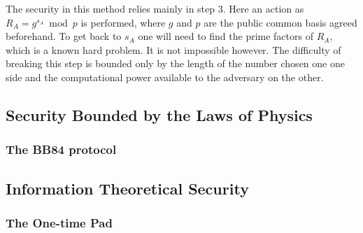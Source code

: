 	The security in this method relies mainly in step 3. Here an action as $ R_A = g^{s_A} \bmod p $ is performed, where $g$ and $p$ are the public common basis agreed beforehand. 
	To get back to $s_A$  one will need to find the prime factors of $R_A$, which is a known hard problem. It is not impossible however. The difficulty of breaking this step is bounded only by the length of the number chosen one one side and the computational power available to the adversary on the other.
		
	\subsection{Security Bounded by the Laws of Physics}
	
		\subsubsection{The BB84 protocol}
		
	
	\subsection{Information Theoretical Security}
	
		\subsubsection{The One-time Pad}
